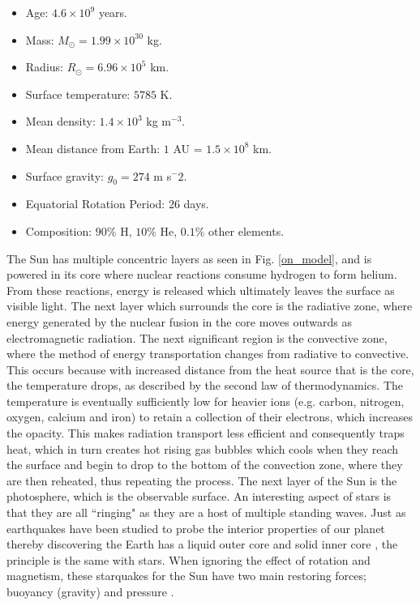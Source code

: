 \begin{itemize}
    \item Age: $4.6 \times 10^9$ years.
    \item Mass: $M_{\odot}= 1.99 \times 10^{30}$ kg.
    \item Radius: $R_{\odot} = 6.96 \times 10^5$ km.
    \item Surface temperature: $5785$ K.
    \item Mean density: $1.4 \times 10^3$ kg m$^{-3}$.
    \item Mean distance from Earth: $1$ AU = $1.5 \times 10^8$ km.
    \item Surface gravity: $g_{0}=274$ m s$^-2$.
    \item Equatorial Rotation Period: $26$ days.
    \item Composition: $90 \%$ H, $10 \%$ He, $0.1 \%$ other elements.
\end{itemize}
%
The Sun has multiple concentric layers as seen in Fig. \ref{on_model}, and is powered in its core where nuclear reactions consume hydrogen to form helium. From these reactions, energy is released which ultimately leaves the surface as visible light. The next layer which surrounds the core is the radiative zone, where energy generated by the nuclear fusion in the core moves outwards as electromagnetic radiation. The next significant region is the convective zone, where the method of energy transportation changes from radiative to convective. This occurs because with increased distance from the heat source that is the core, the temperature drops, as described by the second law of thermodynamics. The temperature is eventually sufficiently low for heavier ions (e.g. carbon, nitrogen, oxygen, calcium and iron) to retain a collection of their electrons, which increases the opacity. This makes radiation transport less efficient and consequently traps heat, which in turn creates hot rising gas bubbles which cools when they reach the surface and begin to drop to the bottom of the convection zone, where they are then reheated, thus repeating the process. The next layer of the Sun is the photosphere, which is the observable surface. \np
%
An interesting aspect of stars is that they are all ``ringing" as they are a host of multiple standing waves. Just as earthquakes have been studied to probe the interior properties of our planet thereby discovering the Earth has a liquid outer core and solid inner core \citep{Lehmann1936}, the principle is the same with stars. When ignoring the effect of rotation and magnetism, these starquakes for the Sun have two main restoring forces; buoyancy (gravity) and pressure \citep{Appourchaux2010AARv18197A}. \np
